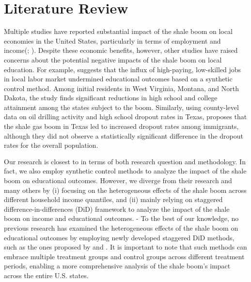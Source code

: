 \section{Literature Review}


Multiple studies have reported substantial impact of the shale boom on local economies in the United States,
particularly in terms of employment and income(\cite{ihs2012america}; \cite{weinstein2011economic}).
Despite these economic benefits, however, other studies have raised concerns about the potential negative impacts of the shale boom on local education.
For example, \textcite{rickman2017shale} suggests that the influx of high-paying, low-skilled jobs in local labor market undermined educational outcomes based on a synthetic control method.
Among initial residents in West Virginia, Montana, and North Dakota, the study finds significant reductions in high school and college attainment among the states subject to the boom. 
Similarly, using county-level data on oil drilling activity and high school dropout rates in Texas, \textcite{carpenter2019texas} proposes that the shale gas boom in Texas led to increased dropout rates among immigrants, 
although they did not observe a statistically significant difference in the dropout rates for the overall population.

Our research is closest to \textcite{rickman2017shale} in terms of both research question and methodology. 
In fact, we also employ synthetic control methods to analyze the impact of the shale boom on educational outcomes.
However, we diverge from their research and many others
by (i) focusing on the heterogeneous effects of the shale boom across different household income quantiles, and (ii) mainly relying on staggered difference-in-differences (DiD) framework to analyze the impact of the shale boom on income and educational outcomes. -
To the best of our knowledge, no previous research has examined the heterogeneous effects of the shale boom on educational outcomes by employing newly developed staggered DiD methods, such as the ones proposed by \textcite{callaway2021difference} and \textcite{sun_estimating_2021}.
It is important to note that such methods can embrace multiple treatment groups and control groups
across different treatment periods, enabling a more comprehensive analysis of the shale boom's impact across the entire U.S. states.
